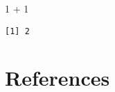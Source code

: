 \documentclass[
  12pt,
  letterpaper,
  DIV=11,
  numbers=noendperiod]{scrreprt}
\newenvironment{Shaded}{\begin{snugshade}}{\end{snugshade}}
\newcommand{\DecValTok}[1]{\textcolor[rgb]{0.68,0.00,0.00}{#1}}
\newcommand{\SpecialCharTok}[1]{\textcolor[rgb]{0.37,0.37,0.37}{#1}}
\begin{document}
\begin{Shaded}
\begin{Highlighting}[]
\DecValTok{1} \SpecialCharTok{+} \DecValTok{1}
\end{Highlighting}
\end{Shaded}

\begin{verbatim}
[1] 2
\end{verbatim}


\chapter*{References}\label{references}

\end{document}
